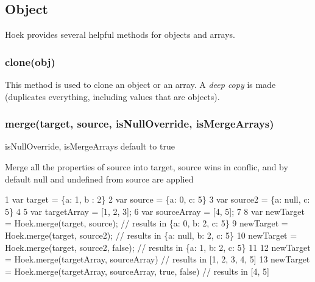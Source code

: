 \subsection*{Object}

Hoek provides several helpful methods for objects and arrays.

\subsubsection*{clone(obj)}

This method is used to clone an object or an array. A {\itshape deep copy} is made (duplicates everything, including values that are objects).




\subsubsection*{merge(target, source, is\+Null\+Override, is\+Merge\+Arrays)}

is\+Null\+Override, is\+Merge\+Arrays default to true

Merge all the properties of source into target, source wins in conflic, and by default null and undefined from source are applied


\begin{DoxyCode}
1 var target = \{a: 1, b : 2\}
2 var source = \{a: 0, c: 5\}
3 var source2 = \{a: null, c: 5\}
4 
5 var targetArray = [1, 2, 3];
6 var sourceArray = [4, 5];
7 
8 var newTarget = Hoek.merge(target, source);     // results in \{a: 0, b: 2, c: 5\}
9 newTarget = Hoek.merge(target, source2);        // results in \{a: null, b: 2, c: 5\}
10 newTarget = Hoek.merge(target, source2, false); // results in \{a: 1, b: 2, c: 5\}
11 
12 newTarget = Hoek.merge(targetArray, sourceArray)              // results in [1, 2, 3, 4, 5]
13 newTarget = Hoek.merge(targetArray, sourceArray, true, false) // results in [4, 5]
\end{DoxyCode}


